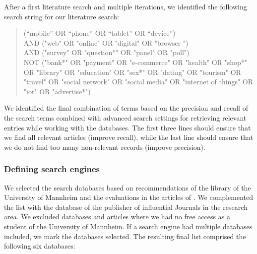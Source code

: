After a first literature search and multiple iterations, we identified the following search string for our literature search: \\

\begin{quote}
    (“mobile” OR “phone” OR “tablet” OR “device”) \\

    AND ("web" OR "online" OR "digital" OR "browser ")  \\
    
    AND ("survey" OR "question*" OR "panel" OR "poll")  \\
    
    NOT ("bank*" OR "payment" OR "e-commerce" OR "health" OR "shop*" OR "library" OR "education" OR "sex*" OR "dating" OR "tourism" OR "travel" OR "social network" OR "social media" OR "internet of things" OR "iot" OR "advertise*")\\
\end{quote}

We identified the final combination of terms based on the precision and recall of the search terms combined with advanced search settings for retrieving relevant entries while working with the databases. The first three lines should ensure that we find all relevant articles (improve recall), while the last line should ensure that we do not find too many non-relevant records (improve precision).


\subsubsection{Defining search engines}
\label{subsubsec: Defining search engines}

We selected the search databases based on recommendations of the library of the University of Mannheim and the evaluations in the articles of \cite{pascoe_systematic_2021, papaioannou_literature_2010, gusenbauer_which_2020}. We complemented the list with the database of the publisher of influential Journals in the research area. We excluded databases and articles where we had no free access as a student of the University of Mannheim. If a search engine had multiple databases included, we mark the databases selected. The resulting final list comprised the following six databases:

